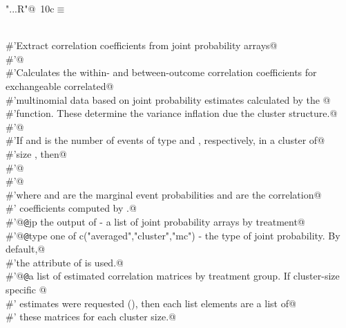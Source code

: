 \documentclass[reqno]{amsart}
\renewcommand{\NWtarget}[2]{\hypertarget{#1}{#2}}
\begin{document}
\begin{flushleft} \small\label{scrap43}\raggedright\small
\NWtarget{nuweb10c}{} \verb@"..\R\ExchMultinomial.R"@\nobreak\ {\footnotesize {10c}}$\equiv$
\vspace{-1ex}
\begin{list}{}{} \item
\mbox{}\verb@@\\
\mbox{}\verb@#'Extract correlation coefficients from joint probability arrays@\\
\mbox{}\verb@#'@\\
\mbox{}\verb@#'Calculates the within- and between-outcome correlation coefficients for exchangeable correlated@\\
\mbox{}\verb@#'multinomial data based on joint probability estimates calculated by the @\\
\mbox{}\verb@#'function. These determine the variance inflation due the cluster structure.@\\
\mbox{}\verb@#'@\\
\mbox{}\verb@#'If  and  is the number of events of type  and , respectively, in a cluster of@\\
\mbox{}\verb@#'size , then@\\
\mbox{}\verb@#'@\\
\mbox{}\verb@#'@\\
\mbox{}\verb@#'where  and  are the marginal event probabilities and  are the correlation@\\
\mbox{}\verb@#' coefficients computed by .@\\
\mbox{}\verb@#'@{\tt @}\verb@param jp the output of  - a list of joint probability arrays by treatment@\\
\mbox{}\verb@#'@{\tt @}\verb@param type one of c("averaged","cluster","mc") - the type of joint probability. By default,@\\
\mbox{}\verb@#'the  attribute of  is used.@\\
\mbox{}\verb@#'@{\tt @}\verb@return a list of estimated correlation matrices by treatment group. If cluster-size specific @\\
\mbox{}\verb@#' estimates were requested (), then each list elements are a list of@\\
\mbox{}\verb@#' these matrices for each cluster size.@\\

\end{list}
\end{flushleft}
\end{document}
